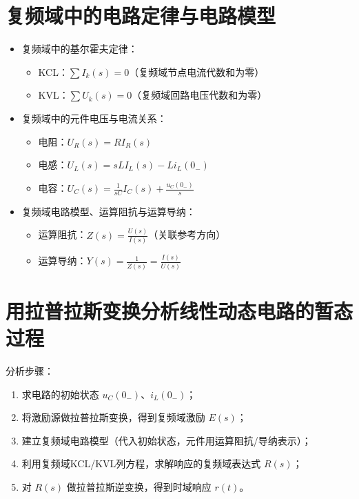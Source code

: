 \section{复频域中的电路定律与电路模型}
\begin{itemize}
    \item 复频域中的基尔霍夫定律：
          \begin{itemize}
              \item KCL：$\sum I_k(s) = 0$（复频域节点电流代数和为零）
              \item KVL：$\sum U_k(s) = 0$（复频域回路电压代数和为零）
          \end{itemize}
    \item 复频域中的元件电压与电流关系：
          \begin{itemize}
              \item 电阻：$U_R(s) = R I_R(s)$
              \item 电感：$U_L(s) = sL I_L(s) - Li_L(0_-)$
              \item 电容：$U_C(s) = \frac{1}{sC} I_C(s) + \frac{u_C(0_-)}{s}$
          \end{itemize}
    \item 复频域电路模型、运算阻抗与运算导纳：
          \begin{itemize}
              \item 运算阻抗：$Z(s) = \frac{U(s)}{I(s)}$（关联参考方向）
              \item 运算导纳：$Y(s) = \frac{1}{Z(s)} = \frac{I(s)}{U(s)}$
          \end{itemize}
\end{itemize}

\section{用拉普拉斯变换分析线性动态电路的暂态过程}
分析步骤：
\begin{enumerate}
    \item 求电路的初始状态 $u_C(0_-)$、$i_L(0_-)$；
    \item 将激励源做拉普拉斯变换，得到复频域激励 $E(s)$；
    \item 建立复频域电路模型（代入初始状态，元件用运算阻抗/导纳表示）；
    \item 利用复频域KCL/KVL列方程，求解响应的复频域表达式 $R(s)$；
    \item 对 $R(s)$ 做拉普拉斯逆变换，得到时域响应 $r(t)$。
\end{enumerate}

